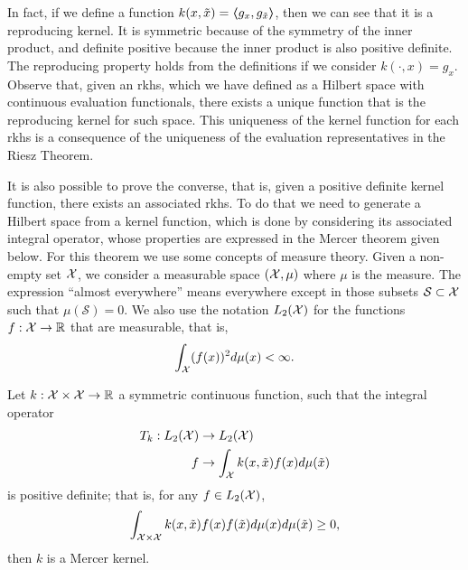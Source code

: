 In fact, if we define a function $k(x, \tilde{x}) = \bm{\left\langle} g_x, g_{\tilde{x}} \bm{\right\rangle}$, then we can see that it is a reproducing kernel. It is symmetric because of the symmetry of the inner product, and definite positive because the inner product is also positive definite. The reproducing property 
holds from the definitions if we consider $k(\cdot, x) = g_x$.
%
Observe that, given an \acrshort{rkhs}, which we have defined as a Hilbert space with continuous evaluation functionals, there exists a unique function that is the reproducing kernel for such space. This uniqueness of the kernel function for each \acrshort{rkhs} is a consequence of the uniqueness of the evaluation representatives in the Riesz Theorem.
%

It is also possible to prove the converse, that is, given a positive definite kernel function, there exists an associated \acrshort{rkhs}.
To do that we need to generate a Hilbert space from a kernel function, which is done by considering its associated integral operator, whose properties are expressed in the Mercer theorem given below. For this theorem we use some concepts of measure theory. 
%
Given a non-empty set $\mathcal{X}$, we consider a measurable space $(\mathcal{X}, \mu)$ where $\mu$ is the measure. The expression ``almost everywhere'' means everywhere except in those subsets $\mathcal{S} \subset \mathcal{X}$ such that $\mu(\mathcal{S}) = 0$. We also use the notation $L_2(\mathcal{X})$ for the functions $f: \mathcal{X} \to \mathbb{R}$ that are measurable, that is,
$$ \int_{\mathcal{X}} (f(x))^2 d\mu(x) < \infty .$$

\begin{definition}
    Let $k: \mathcal{X} \times \mathcal{X} \to \mathbb{R}$ a symmetric continuous function, such that the integral operator 
    \begin{equation}
        \begin{aligned}
    \nonumber
    T_k: L_2(\mathcal{X}) &\to L_2(\mathcal{X}) \\
    f &\to \int_{\mathcal{X}} k(x, \tilde{x}) f(x) d \mu(\tilde{x}) 
\end{aligned}
\end{equation}    
is positive definite; that is, for any $f \in L_2(\mathcal{X})$, 
\begin{equation}
    \nonumber
    \int_{\mathcal{X} \times \mathcal{X}} k(x, \tilde{x}) f(x) f(\tilde{x}) d\mu(x) d\mu(\tilde{x}) \geq 0 ,
\end{equation}
then $k$ is a Mercer kernel.
\end{definition}

